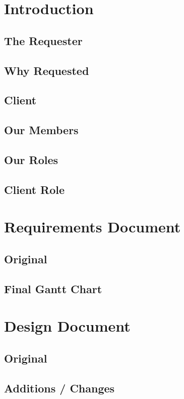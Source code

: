 \documentclass[draftclsnofoot, onecolumn, compsoc, 10pt]{IEEEtran}
\begin{document}
\section{Introduction}
\subsection{The Requester}
\subsection{Why Requested}
\subsection{Client}
\subsection{Our Members}
\subsection{Our Roles}
\subsection{Client Role}
\section{Requirements Document}
\subsection{Original}

\subsection{Final Gantt Chart}
\section{Design Document}
\subsection{Original}

\subsection{Additions / Changes}
\end{document}
